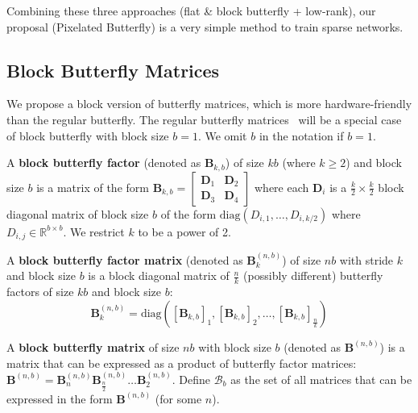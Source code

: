 Combining these three approaches (flat \& block butterfly + low-rank), our proposal (Pixelated Butterfly) is a very simple method to train sparse networks.

\subsection{Block Butterfly Matrices}
\label{sec:block_butterfly}

We propose a block version of butterfly matrices, which is more hardware-friendly than the regular butterfly. The regular butterfly matrices~\citet{dao2019learning, dao2020kaleidoscope} will be a special case of block butterfly with block size $b = 1$. We omit $b$ in the notation if $b = 1$.

\begin{definition} \label{def:bfactor}
  A \textbf{block butterfly factor} (denoted as $\mathbf{B}_{k, b}$) of size $kb$ (where $k \ge 2$) and block size $b$ is a matrix of the form
    \(
        \mathbf{B}_{k, b} = \begin{bmatrix}
            \mathbf{D}_1 & \mathbf{D}_2 \\ \mathbf{D}_3 & \mathbf{D}_4
        \end{bmatrix}
    \)
    where each $\mathbf{D}_i$ is a $\frac{k}{2} \times \frac{k}{2}$ block diagonal matrix of block size $b$ of the form
    $\mathrm{diag} \left( D_{i, 1}, \dots, D_{i, k/2} \right)$ where $D_{i, j} \in \mathbb{R}^{b \times b}$. We restrict $k$ to be a power of 2.
\end{definition}

\begin{definition}
  A \textbf{block butterfly factor matrix} (denoted as $\mathbf{B}_{k}^{(n, b)}$) of size $nb$ with stride $k$ and block size $b$ is a block diagonal matrix of $\frac{n}{k}$ (possibly different) butterfly factors of size $kb$ and block size $b$:
     \[
        \mathbf{B}_{k}^{(n, b)} = \mathrm{diag} \left( \left[ \mathbf{B}_{k, b} \right]_1, \left[ \mathbf{B}_{k, b} \right]_2, \hdots, \left[ \mathbf{B}_{k, b} \right]_\frac{n}{k} \right)
     \]
\end{definition}

\begin{definition} \label{def:bmatrix}
    A \textbf{block butterfly matrix} of size $nb$ with block size $b$ (denoted as $\mathbf{B}^{(n, b)}$) is a matrix that can be expressed as a product of butterfly factor matrices:
    \(
        \mathbf{B}^{(n, b)} = \mathbf{B}_n^{(n, b)} \mathbf{B}_{\frac{n}{2}}^{(n, b)} \hdots \mathbf{B}_2^{(n, b)}.
    \)
    Define $\mathcal{B}_b$ as the set of all matrices that can be expressed in the form $\mathbf{B}^{(n, b)}$ (for some $n$).
\end{definition}

